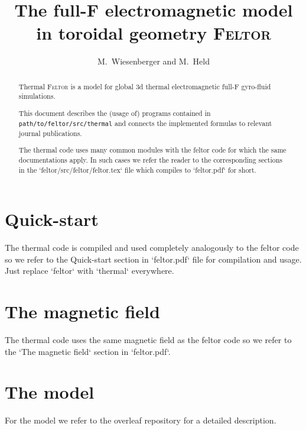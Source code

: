 


\usepackage{minted}



\title{
The full-F electromagnetic model in toroidal geometry \textsc{Feltor}}
\author{ M.~Wiesenberger and M.~Held}
\maketitle

\begin{abstract}
Thermal \textsc{Feltor} is a model for global 3d thermal electromagnetic full-F gyro-fluid simulations.

\noindent
This document describes the (usage of) programs
contained in \texttt{path/to/feltor/src/thermal}
and connects
the implemented formulas to relevant journal publications.

The thermal code uses many common modules with the feltor code for which the same documentations apply. In such cases we refer the reader to the corresponding sections in the `feltor/src/feltor/feltor.tex` file which compiles to `feltor.pdf` for short.
\end{abstract}
\tableofcontents

\section{Quick-start}
The thermal code is compiled and used completely analogously to the feltor code so we refer to the Quick-start section in `feltor.pdf` file for compilation and usage. Just replace `feltor` with `thermal` everywhere.
\section{The magnetic field} \label{sec:magnetic}
The thermal code uses the same magnetic field as the feltor code so we refer to the `The magnetic field` section in `feltor.pdf`.


\section{The model} \label{sec:model}
For the model we refer to the overleaf repository for a detailed description.

